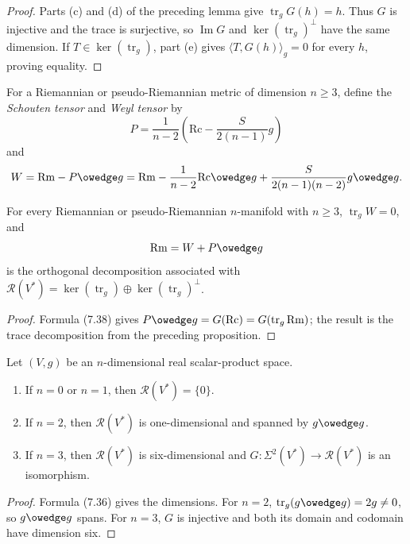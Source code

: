 \begin{proof}
\sketch
Parts (c) and (d) of the preceding lemma give
$\operatorname{tr}_gG(h)=h$.  Thus $G$ is injective and the trace is
surjective, so $\operatorname{Im}G$ and
$\ker(\operatorname{tr}_g)^\perp$ have the same dimension.  If
$T\in\ker(\operatorname{tr}_g)$, part (e) gives
$\langle T,G(h)\rangle_g=0$ for every $h$, proving equality.
\end{proof}

For a Riemannian or pseudo-Riemannian metric of dimension $n\geq3$, define
the \emph{Schouten tensor} and \emph{Weyl tensor} by
\[
P=\frac1{n-2}\left(\mathrm{Rc}-\frac{S}{2(n-1)}g\right)
\]
and
\[
W=\mathrm{Rm}-P\owedge g
=\mathrm{Rm}-\frac1{n-2}\mathrm{Rc}\owedge g
+\frac{S}{2(n-1)(n-2)}g\owedge g.
\]

\begin{proposition}
\label{prop:weyl-decomposition}
For every Riemannian or pseudo-Riemannian $n$-manifold with $n\geq3$,
$\operatorname{tr}_gW=0$, and
\[
\mathrm{Rm}=W+P\owedge g
\]
is the orthogonal decomposition associated with
$\mathscr R(V^*)=\ker(\operatorname{tr}_g)
\oplus\ker(\operatorname{tr}_g)^\perp$.
\end{proposition}

\begin{proof}
\sketch
Formula (7.38) gives
$P\owedge g=G(\mathrm{Rc})=G(\operatorname{tr}_g\mathrm{Rm})$; the result is
the trace decomposition from the preceding proposition.
\end{proof}

\begin{corollary}
\label{cor:curvature-space-dimensions}
Let $(V,g)$ be an $n$-dimensional real scalar-product space.
\begin{enumerate}
\item[(a)] If $n=0$ or $n=1$, then $\mathscr R(V^*)=\{0\}$.
\item[(b)] If $n=2$, then $\mathscr R(V^*)$ is one-dimensional and spanned by
$g\owedge g$.
\item[(c)] If $n=3$, then $\mathscr R(V^*)$ is six-dimensional and
$G:\Sigma^2(V^*)\to\mathscr R(V^*)$ is an isomorphism.
\end{enumerate}
\end{corollary}

\begin{proof}
\sketch
Formula (7.36) gives the dimensions.  For $n=2$,
$\operatorname{tr}_g(g\owedge g)=2g\ne0$, so $g\owedge g$ spans.  For $n=3$,
$G$ is injective and both its domain and codomain have dimension six.
\end{proof}

